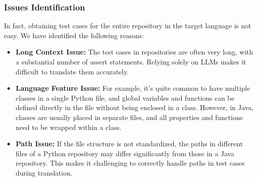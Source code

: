 \subsubsection{Issues Identification}
In fact, obtaining test cases for the entire repository in the target language is not easy. We have identified the following reasons:
\begin{itemize}[left=10pt]
    \item \textbf{Long Context Issue:} The test cases in repositories are often very long, with a substantial number of assert statements. Relying solely on LLMs makes it difficult to translate them accurately.
    \item \textbf{Language Feature Issue:} For example, it's quite common to have multiple classes in a single Python file, and global variables and functions can be defined directly in the file without being enclosed in a class. However, in Java, classes are usually placed in separate files, and all properties and functions need to be wrapped within a class.
    \item \textbf{Path Issue:} If the file structure is not standardized, the paths in different files of a Python repository may differ significantly from those in a Java repository. This makes it challenging to correctly handle paths in test cases during translation.
\end{itemize}

